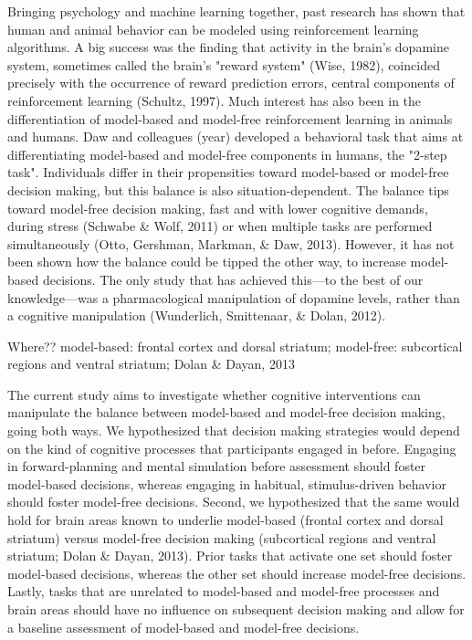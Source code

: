 \documentclass[11pt]{article} %
\begin{document}
Bringing psychology and machine learning together, past research has shown that human and animal behavior can be modeled using reinforcement learning algorithms. A big success was the finding that activity in the brain's dopamine system, sometimes called the brain's "reward system" (Wise, 1982), coincided precisely with the occurrence of reward prediction errors, central components of reinforcement learning (Schultz, 1997). Much interest has also been in the differentiation of model-based and model-free reinforcement learning in animals and humans. Daw and colleagues (year) developed a behavioral task that aims at differentiating model-based and model-free components in humans, the "2-step task". Individuals differ in their propensities toward model-based or model-free decision making, but this balance is also situation-dependent. The balance tips toward model-free decision making, fast and with lower cognitive demands, during stress (Schwabe \& Wolf, 2011) or when multiple tasks are performed simultaneously (Otto, Gershman, Markman, \& Daw, 2013). However, it has not been shown how the balance could be tipped the other way, to increase model-based decisions. The only study that has achieved this---to the best of our knowledge---was a pharmacological manipulation of dopamine levels, rather than a cognitive manipulation (Wunderlich, Smittenaar, \& Dolan, 2012).

Where?? model-based: frontal cortex and dorsal striatum; model-free: subcortical regions and ventral striatum; Dolan \& Dayan, 2013

The current study aims to investigate whether cognitive interventions can manipulate the balance between model-based and model-free decision making, going both ways. We hypothesized that decision making strategies would depend on the kind of cognitive processes that participants engaged in before. Engaging in forward-planning and mental simulation before assessment should foster model-based decisions, whereas engaging in habitual, stimulus-driven behavior should foster model-free decisions. Second, we hypothesized that the same would hold for brain areas known to underlie model-based (frontal cortex and dorsal striatum) versus model-free decision making (subcortical regions and ventral striatum; Dolan \& Dayan, 2013). Prior tasks that activate one set should foster model-based decisions, whereas the other set should increase model-free decisions. Lastly, tasks that are unrelated to model-based and model-free processes and brain areas should have no influence on subsequent decision making and allow for a baseline assessment of model-based and model-free decisions.
\end{document}
